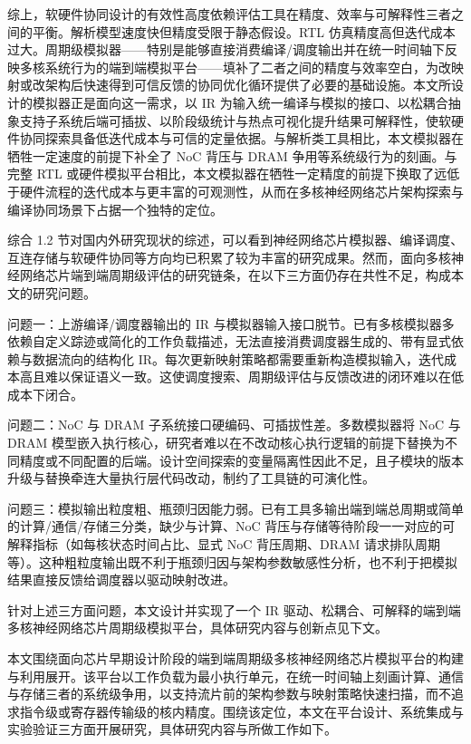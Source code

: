 综上，软硬件协同设计的有效性高度依赖评估工具在精度、效率与可解释性三者之间的平衡。解析模型速度快但精度受限于静态假设。RTL 仿真精度高但迭代成本过大。周期级模拟器——特别是能够直接消费编译/调度输出并在统一时间轴下反映多核系统行为的端到端模拟平台——填补了二者之间的精度与效率空白，为改映射或改架构后快速得到可信反馈的协同优化循环提供了必要的基础设施。本文所设计的模拟器正是面向这一需求，以 IR 为输入统一编译与模拟的接口、以松耦合抽象支持子系统后端可插拔、以阶段级统计与热点可视化提升结果可解释性，使软硬件协同探索具备低迭代成本与可信的定量依据。与解析类工具相比，本文模拟器在牺牲一定速度的前提下补全了 NoC 背压与 DRAM 争用等系统级行为的刻画。与完整 RTL 或硬件模拟平台相比，本文模拟器在牺牲一定精度的前提下换取了远低于硬件流程的迭代成本与更丰富的可观测性，从而在多核神经网络芯片架构探索与编译协同场景下占据一个独特的定位。


综合 1.2 节对国内外研究现状的综述，可以看到神经网络芯片模拟器、编译调度、互连存储与软硬件协同等方向均已积累了较为丰富的研究成果。然而，面向多核神经网络芯片端到端周期级评估的研究链条，在以下三方面仍存在共性不足，构成本文的研究问题。

问题一：上游编译/调度器输出的 IR 与模拟器输入接口脱节。已有多核模拟器多依赖自定义踪迹或简化的工作负载描述，无法直接消费调度器生成的、带有显式依赖与数据流向的结构化 IR。每次更新映射策略都需要重新构造模拟输入，迭代成本高且难以保证语义一致。这使调度搜索、周期级评估与反馈改进的闭环难以在低成本下闭合。

问题二：NoC 与 DRAM 子系统接口硬编码、可插拔性差。多数模拟器将 NoC 与 DRAM 模型嵌入执行核心，研究者难以在不改动核心执行逻辑的前提下替换为不同精度或不同配置的后端。设计空间探索的变量隔离性因此不足，且子模块的版本升级与替换牵连大量执行层代码改动，制约了工具链的可演化性。

问题三：模拟输出粒度粗、瓶颈归因能力弱。已有工具多输出端到端总周期或简单的计算/通信/存储三分类，缺少与计算、NoC 背压与存储等待阶段一一对应的可解释指标（如每核状态时间占比、显式 NoC 背压周期、DRAM 请求排队周期等）。这种粗粒度输出既不利于瓶颈归因与架构参数敏感性分析，也不利于把模拟结果直接反馈给调度器以驱动映射改进。

针对上述三方面问题，本文设计并实现了一个 IR 驱动、松耦合、可解释的端到端多核神经网络芯片周期级模拟平台，具体研究内容与创新点见下文。



本文围绕面向芯片早期设计阶段的端到端周期级多核神经网络芯片模拟平台的构建与利用展开。该平台以工作负载为最小执行单元，在统一时间轴上刻画计算、通信与存储三者的系统级争用，以支持流片前的架构参数与映射策略快速扫描，而不追求指令级或寄存器传输级的核内精度。围绕该定位，本文在平台设计、系统集成与实验验证三方面开展研究，具体研究内容与所做工作如下。

